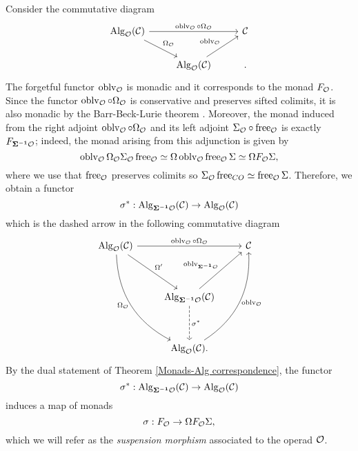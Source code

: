\begin{construction}

Consider the commutative diagram
\[
\begin{tikzcd}
     \Alg_{\CO}(\CC) &   & \CC\\
                     & \Alg_{\CO}(\CC) &
    \arrow[from = 1-1, to = 1-3, "\oblv_{\CO}\circ \Omega_{\CO}"]
    \arrow[from = 1-1, to = 2-2, "\Omega_{\CO}" ]
    \arrow[from = 2-2, to = 1-3, "\oblv_{\CO}"].
\end{tikzcd}
\]
The forgetful functor $\operatorname{oblv}_{{\mathcal{O}}}$ is monadic and it corresponds to the monad $F_{{\mathcal{O}}}$. Since the functor $\operatorname{oblv}_{{\mathcal{O}}}\circ \Omega_{{\mathcal{O}}}$ is conservative and preserves sifted colimits, it is also monadic by the Barr-Beck-Lurie theorem \cite[Theorem 4.7.3.5.]{HA}. Moreover, the monad induced from the right adjoint $\operatorname{oblv}_{{\mathcal{O}}}\circ \Omega_{{\mathcal{O}}}$ and its left adjoint $\Sigma_{{\mathcal{O}}}\circ \operatorname{free}_{{\mathcal{O}}}$ is exactly $F_{\bf{\Sigma}^{-1} {\mathcal{O}}}$; indeed, the monad arising from this adjunction is given by
$$
\operatorname{oblv}_{\mathcal{O}}  \Omega_{\mathcal{O}} \Sigma_{\mathcal{O}} \operatorname{free}_{\mathcal{O}} \simeq \Omega \operatorname{oblv}_{{\mathcal{O}}}\operatorname{free}_{{\mathcal{O}}} \Sigma
\simeq \Omega F_{{\mathcal{O}}} \Sigma,
$$
where we use that $\operatorname{free}_{{\mathcal{O}}}$ preserves colimits so $\Sigma_{{\mathcal{O}}} \operatorname{free}_{
CO}\simeq \operatorname{free}_{{\mathcal{O}}} \Sigma$.
Therefore, we obtain a functor 
$$
\sigma^{*}: \operatorname{Alg}_{\bf{\Sigma}^{-1} {\mathcal{O}} }({\mathcal{C}}) 
\to 
\operatorname{Alg}_{{\mathcal{O}}}({\mathcal{C}})
$$
which is the dashed arrow in the following commutative diagram
\[
\begin{tikzcd}
     \Alg_{\CO}(\CC) &   & \CC \\
                     &   &      \\
                     & \Alg_{\bf{\Sigma}^{-1} \CO }(\CC)  & \\
                     &   & \\
                     & \Alg_{ \CO }(\CC) 
    \arrow[from = 1-1, to = 1-3, "\oblv_{\CO}\circ \Omega_{\CO}"]
    \arrow[from = 1-1, to = 3-2, "\Omega'"]
    \arrow[from = 3-2, to = 1-3, "\oblv_{\bf{\Sigma}^{-1} \CO }"]
    \arrow[from = 1-1, to = 5-2, "\Omega_{\CO}" left , bend right]
    \arrow[from = 5-2, to = 1-3, "\oblv_{\CO}" right , bend right]
    \arrow[from = 3-2, to = 5-2, "\sigma^{*}", dashed]
    .
\end{tikzcd}
\]
By the dual statement of Theorem \ref{Monads-Alg correspondence}, the functor 
$$
\sigma^{*}:
 \operatorname{Alg}_{\bf{\Sigma}^{-1} {\mathcal{O}} }({\mathcal{C}})\to \operatorname{Alg}_{{\mathcal{O}}}({\mathcal{C}})
$$
induces a map of monads
\begin{equation}
\label{suspension morphism}
    \sigma: F_{{\mathcal{O}}}\to \Omega F_{{\mathcal{O}}}\Sigma, 
\end{equation}
which we will refer as the \emph{suspension morphism} associated to the operad ${\mathcal{O}}$.
\end{construction}





